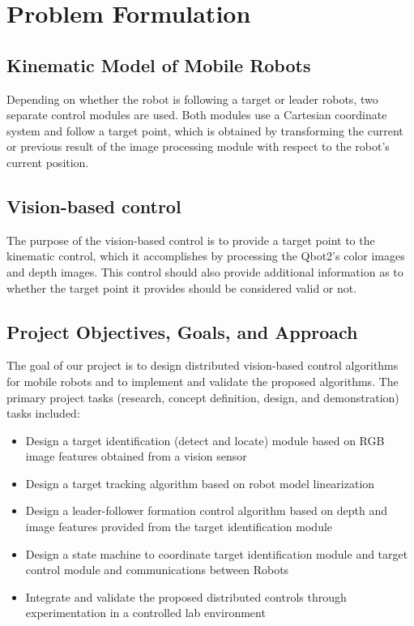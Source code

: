 \chapter{Problem Formulation}


\section{Kinematic Model of Mobile Robots}

Depending on whether the robot is following a target or leader robots, two separate control modules are used. Both modules use a Cartesian coordinate system and follow a target point, which is obtained by transforming the current or previous result of the image processing module with respect to the robot’s current position.

\section{Vision-based control}
The purpose of the vision-based control is to provide a target point to the kinematic control, which it accomplishes by processing the Qbot2’s color images and depth images. This control should also provide additional information as to whether the target point it provides should be considered valid or not.


\section{Project Objectives, Goals, and Approach}
The goal of our project is to design distributed vision-based control algorithms for mobile robots and to implement and validate the proposed algorithms. The primary project tasks (research, concept definition, design, and demonstration) tasks included:

\begin{itemize}
\item	Design a target identification (detect and locate) module based on RGB image features obtained from a vision sensor
\item	Design a target tracking algorithm based on robot model linearization
\item	Design a leader-follower formation control algorithm based on depth and image features provided from the target identification module 
\item	Design a state machine to coordinate target identification module and target control module and communications between Robots
\item	Integrate and validate the proposed distributed controls through experimentation in a controlled lab environment
\end{itemize}


